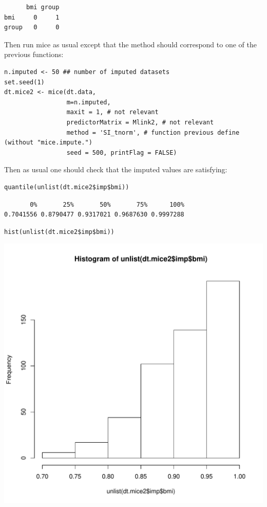 \documentclass[12pt]{article}
\begin{document}
\begin{verbatim}
      bmi group
bmi     0     1
group   0     0
\end{verbatim}

\clearpage 

Then run mice as usual except that the method should correspond to one of the previous functions:
\lstset{language=r,label= ,caption= ,captionpos=b,numbers=none}
\begin{lstlisting}
n.imputed <- 50 ## number of imputed datasets
set.seed(1)
dt.mice2 <- mice(dt.data,
				 m=n.imputed, 
				 maxit = 1, # not relevant
				 predictorMatrix = Mlink2, # not relevant
				 method = 'SI_tnorm', # function previous define (without "mice.impute.")
				 seed = 500, printFlag = FALSE)
\end{lstlisting}

Then as usual one should check that the imputed values are satisfying:
\lstset{language=r,label= ,caption= ,captionpos=b,numbers=none}
\begin{lstlisting}
quantile(unlist(dt.mice2$imp$bmi))
\end{lstlisting}

\begin{verbatim}
       0%       25%       50%       75%      100% 
0.7041556 0.8790477 0.9317021 0.9687630 0.9997288
\end{verbatim}


\lstset{language=r,label= ,caption= ,captionpos=b,numbers=none}
\begin{lstlisting}
hist(unlist(dt.mice2$imp$bmi))
\end{lstlisting}

\begin{center}
\includegraphics[width=.9\linewidth]{./histImputed2.pdf}
\end{center}
\end{document}
